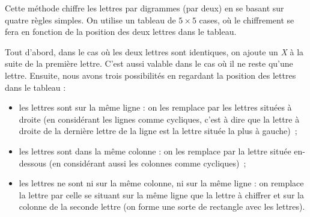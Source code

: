 Cette méthode chiffre les lettres par digrammes (par deux) en se
basant sur quatre règles simples. On utilise un tableau de $5
\times 5$ cases,
où le chiffrement se fera en fonction de la position des deux lettres
dans le tableau.  

Tout d'abord, dans le cas où les deux lettres sont
identiques, on ajoute un \emph{X} à la suite de la première
lettre. C'est aussi valable dans le cas où il ne reste qu'une lettre.
Ensuite, nous avons trois possibilités en regardant la position des
lettres dans le tableau : 
\begin{itemize}
  \item les lettres sont sur la même ligne : on les remplace par les
    lettres situées à droite (en considérant les lignes comme
    cycliques, c'est à dire que la lettre à droite de la dernière
    lettre de la ligne est la lettre située la plus à gauche)~; 
  \item les lettres sont dans la même colonne : on les remplace par la
    lettre située en-dessous (en considérant aussi les colonnes comme
    cycliques)~;
  \item les lettres ne sont ni sur la même colonne, ni sur la même
    ligne : on remplace la lettre par celle se situant sur la même
    ligne que la lettre à chiffrer et sur la colonne de la seconde
    lettre (on forme une sorte de rectangle avec les lettres).
\end{itemize}

